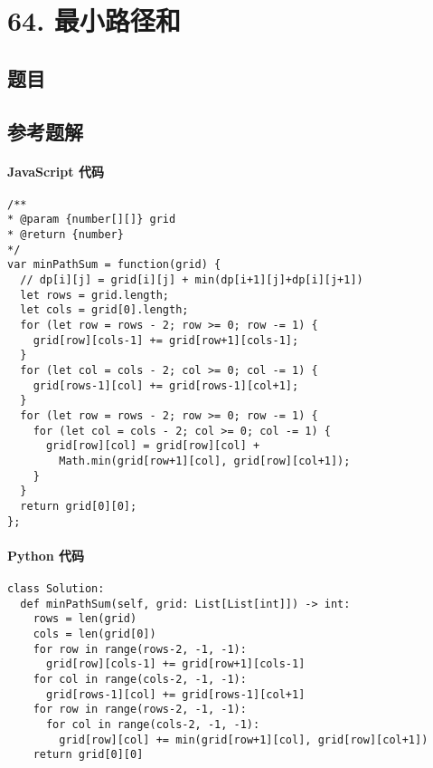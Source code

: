 \newpage
\section{64. 最小路径和}
\label{leetcode:64}

\subsection{题目}

\subsection{参考题解}

\paragraph{JavaScript 代码}

\begin{verbatim}
/**
* @param {number[][]} grid
* @return {number}
*/
var minPathSum = function(grid) {
  // dp[i][j] = grid[i][j] + min(dp[i+1][j]+dp[i][j+1])
  let rows = grid.length;
  let cols = grid[0].length;
  for (let row = rows - 2; row >= 0; row -= 1) {
    grid[row][cols-1] += grid[row+1][cols-1];
  }
  for (let col = cols - 2; col >= 0; col -= 1) {
    grid[rows-1][col] += grid[rows-1][col+1];
  }
  for (let row = rows - 2; row >= 0; row -= 1) {
    for (let col = cols - 2; col >= 0; col -= 1) {
      grid[row][col] = grid[row][col] +
        Math.min(grid[row+1][col], grid[row][col+1]);
    }
  }
  return grid[0][0];
};
\end{verbatim}

\paragraph{Python 代码}

\begin{verbatim}
class Solution:
  def minPathSum(self, grid: List[List[int]]) -> int:
    rows = len(grid)
    cols = len(grid[0])
    for row in range(rows-2, -1, -1):
      grid[row][cols-1] += grid[row+1][cols-1]
    for col in range(cols-2, -1, -1):
      grid[rows-1][col] += grid[rows-1][col+1]
    for row in range(rows-2, -1, -1):
      for col in range(cols-2, -1, -1):
        grid[row][col] += min(grid[row+1][col], grid[row][col+1])
    return grid[0][0]
\end{verbatim}
